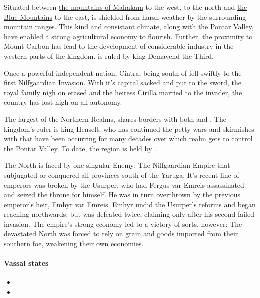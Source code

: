 
{
    Situated between \hyperref[region:mahakamMtns]{the mountains of Mahakam} to the west,  to the north and
    \hyperref[region:blueMtns]{the Blue Mountains} to the east,  is shielded from harsh weather by the surrounding mountain
    ranges. This kind and consistant climate, along with \hyperref[region:pontar]{the Pontar Valley}, have enabled a strong agricultural economy
    to flourish. Further, the proximity to Mount Carbon has lead to the development of considerable industry in the western parts of the kingdom.
     is ruled by king Demavend the Third.
}

{
    Once a powerful independent nation, Cintra, being south of  fell swiftly to the first \hyperref[realm:nilfgaard]{Nilfgaardian}
    Invasion. With it's capital sacked and put to the sword, the royal family nigh on erased and the heiress Cirilla married to the invader, the
    country has lost nigh-on all autonomy.
}

{
    The largest of the Northern Realms,  shares borders with both  and .
    The kingdom's ruler is king Henselt, who has continued the petty wars and skirmishes with  that have been occurring
    for many decades over which realm gets to control the \hyperref[region:pontar]{Pontar Valley}. To date, the region is held by .
}

{
    The North is faced by one singular Enemy: The Nilfgaardian Empire that subjugated or conquered all
    provinces south of the Yaruga. It's recent line of emperors was broken by the Usurper, who had
    Fergus var Emreis assassinated and seized the throne for himself. He was in turn overthrown by the previous
    emperor's heir, Emhyr var Emreis. Emhyr undid the Usurper's reforms and began reaching northwards, but was
    defeated twice, claiming only  after his second failed invasion. The empire's strong
    economy led to a victory of sorts, however: The devastated North was forced to rely on grain and goods imported
    from their southern foe, weakening their own economies.

    \paragraph{Vassal states}
    \begin{itemize}
        \item {}
        \item {}
    \end{itemize}
}

